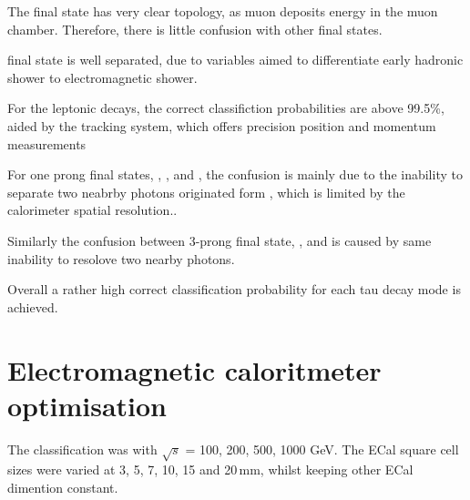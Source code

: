 \documentclass[a4paper,11pt]{article}
\newcommand{\decayElectronShort}{\Pem\PAGne}
\newcommand{\decayMuonShort}{\PGmm\PAGnGm}
\newcommand{\decayPionShort}{\PGpm}
\newcommand{\decayRhoShort}{\PGrP{\PGpm\PGpz}}
\newcommand{\decayAiPhotonShort}{\PaDoP{\PGpm\PGpz\PGpz}}
\newcommand{\decayAiPionShort}{\PaDoP{\PGpm\PGpm\PGpp}}
\newcommand{\decayThreePionPhotonShort}{\PGpm\PGpm\PGpp\PGpz}
\newcommand{\rootS}{\ensuremath{\sqrt{s}} }
\begin{document}
The \decayMuonShort final state has very clear topology, as muon deposits energy in the muon chamber. Therefore, there is little confusion with other final states.

\decayElectronShort final state is well separated, due to variables aimed to differentiate early hadronic shower to electromagnetic shower. 

For the leptonic decays, the correct classifiction probabilities are above 99.5\%, aided by the tracking system, which offers precision position and momentum measurements

For one prong final states, \decayPionShort, \decayRhoShort, and \decayAiPhotonShort, the confusion is mainly due to the inability to separate two neabrby photons originated form \Ppizero, which is limited by the calorimeter spatial resolution.. 

Similarly the confusion between 3-prong final state, \decayAiPionShort, and \decayThreePionPhotonShort is caused by same inability to resolove two nearby photons.

Overall a rather high correct classification probability for each tau decay mode is achieved. 

\section{Electromagnetic caloritmeter optimisation}

The classification was with  \rootS = 100, 200, 500, 1000 GeV. The ECal square cell sizes were varied at 3, 5, 7, 10, 15 and 20\,mm, whilst keeping other ECal dimention constant. 
\end{document}
